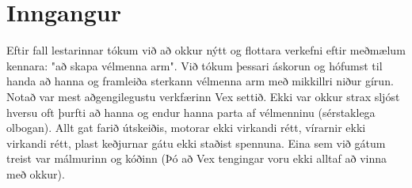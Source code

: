 \section{Inngangur}
Eftir fall lestarinnar tókum við að okkur nýtt og flottara verkefni eftir meðmælum kennara: "að skapa vélmenna arm". Við tókum þessari áskorun og hófumst til handa að hanna og framleiða sterkann vélmenna arm með mikkillri niður gírun. Notað var mest aðgengilegustu verkfærinn Vex settið. Ekki var okkur strax sljóst hversu oft þurfti að hanna og endur hanna parta af vélmenninu (sérstaklega olbogan). Allt gat farið útskeiðis, motorar ekki virkandi rétt, vírarnir ekki virkandi rétt, plast keðjurnar gátu ekki staðist spennuna. Eina sem við gátum treist var málmurinn og kóðinn (Þó að Vex tengingar voru ekki alltaf að vinna með okkur). 
